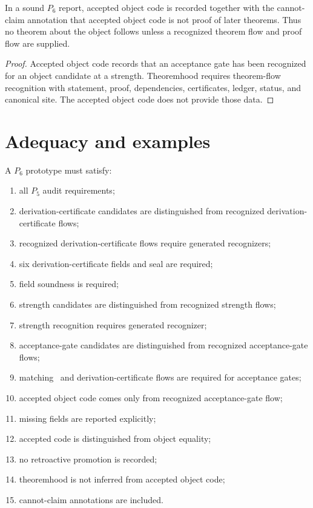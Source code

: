 \begin{theorem}
\label{thm:deriv-accept-code-not-theoremhood}
In a sound $P_6$ report, accepted object code is recorded together with the cannot-claim annotation that accepted object code is not proof of later theorems. Thus no theorem about the object follows unless a recognized theorem flow and proof flow are supplied.
\end{theorem}

\begin{proof}
Accepted object code records that an acceptance gate has been recognized for an object candidate at a strength. Theoremhood requires theorem-flow recognition with statement, proof, dependencies, certificates, ledger, status, and canonical site. The accepted object code does not provide those data.
\end{proof}

\section{Adequacy and examples}
\label{sec:deriv-accept-adequacy-examples}

\begin{definition}
\label{def:deriv-accept-p6-audit}
A $P_6$ prototype must satisfy:
\begin{enumerate}
\item all $P_5$ audit requirements;
\item derivation-certificate candidates are distinguished from recognized derivation-certificate flows;
\item recognized derivation-certificate flows require generated recognizers;
\item six derivation-certificate fields and seal are required;
\item field soundness is required;
\item strength candidates are distinguished from recognized strength flows;
\item strength recognition requires generated recognizer;
\item acceptance-gate candidates are distinguished from recognized acceptance-gate flows;
\item matching \NameCert\ and derivation-certificate flows are required for acceptance gates;
\item accepted object code comes only from recognized acceptance-gate flow;
\item missing fields are reported explicitly;
\item accepted code is distinguished from object equality;
\item no retroactive promotion is recorded;
\item theoremhood is not inferred from accepted object code;
\item cannot-claim annotations are included.
\end{enumerate}
\end{definition}

